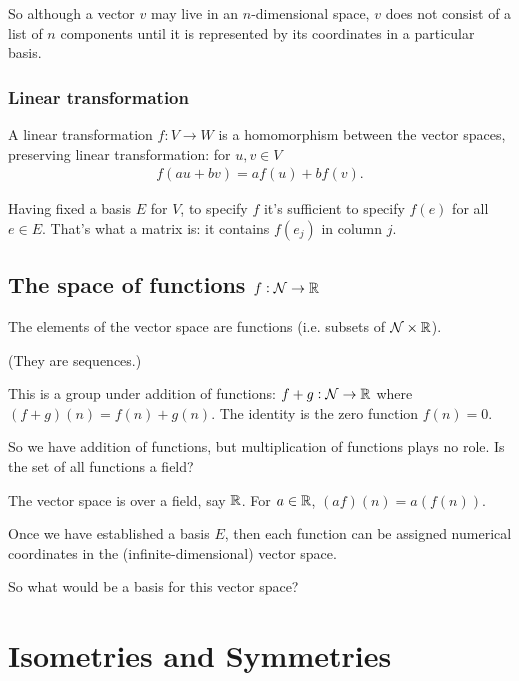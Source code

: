 So although a vector $v$ may live in an $n$-dimensional space, $v$ does not
consist of a list of $n$ components until it is represented by its coordinates
in a particular basis.


\subsubsection{Linear transformation}
A linear transformation $f: V \to W$ is a homomorphism between the vector
spaces, preserving linear transformation: for $u, v \in V$
\begin{align*}
  f(au + bv) = af(u) + bf(v).
\end{align*}

Having fixed a basis $E$ for $V$, to specify $f$ it's sufficient to specify
$f(e)$ for all $e \in E$. That's what a matrix is: it contains $f(e_j)$ in
column $j$.


\subsection{The space of functions $f:\mathcal{N} \to \mathbb{R}$}

The elements of the vector space are functions (i.e. subsets of $\mathcal{N} \times \mathbb{R}$).

(They are sequences.)

This is a group under addition of functions: $f + g: \mathcal{N} \to \mathbb{R}$ where
$(f + g)(n) = f(n) + g(n)$. The identity is the zero function $f(n) = 0$.

So we have addition of functions, but multiplication of functions plays no
role. Is the set of all functions a field?


The vector space is over a field, say $\mathbb{R}$. For $a \in \mathbb{R}$, $(af)(n) = a(f(n))$.

Once we have established a basis $E$, then each function can be assigned
numerical coordinates in the (infinite-dimensional) vector space.

So what would be a basis for this vector space?




\newpage


\section{Isometries and Symmetries}

